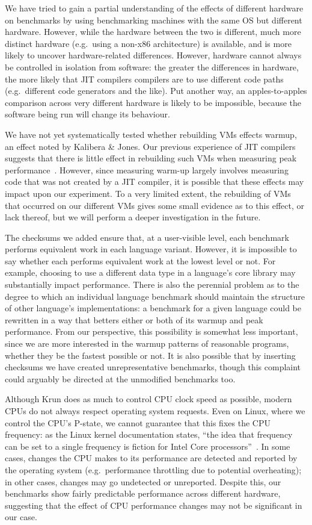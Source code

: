 \documentclass[preprint,numbers,10pt]{sigplanconf}
\newcommand{\kalibera}{Kalibera \& Jones\xspace}
\newcommand{\krun}{Krun\xspace}
\begin{document}
We have tried to gain a partial understanding of the effects of different
hardware on benchmarks by using benchmarking machines with the same OS but
different hardware. However, while the hardware between the two is
different, much more distinct hardware (e.g.~using a non-x86 architecture) is
available, and is more likely to uncover hardware-related differences.
However, hardware cannot always be controlled in isolation from software:
the greater the differences in hardware, the more likely that JIT compilers
compilers are to use different code paths (e.g.~different code generators and
the like). Put another way, an apples-to-apples comparison across very different
hardware is likely to be impossible, because the software being run will
change its behaviour.

We have not yet systematically tested whether rebuilding VMs effects warmup, an
effect noted by \kalibera. Our previous experience of JIT compilers suggests
that there is little effect in rebuilding such VMs when measuring peak
performance~\cite{barrett15approaches}. However, since measuring warm-up largely
involves measuring code that was not created by a JIT compiler, it is possible
that these effects may impact upon our experiment. To a very limited extent, the
rebuilding of VMs that occurred on our different VMs gives some small evidence
as to this effect, or lack thereof, but we will perform a deeper investigation
in the future.

The checksums we added ensure that, at a user-visible level, each benchmark
performs equivalent work in each language variant. However, it is impossible to
say whether each performs equivalent work at the lowest level or not. For
example, choosing to use a different data type in a language's core library may
substantially impact performance. There is also the perennial problem as to the
degree to which an individual language benchmark should maintain the structure
of other language's implementations: a benchmark for a given language could be
rewritten in a way that betters either or both of its warmup and peak
performance. From our perspective, this possibility is somewhat less important,
since we are more interested in the warmup patterns of reasonable programs,
whether they be the fastest possible or not. It is also possible that by
inserting checksums we have created unrepresentative benchmarks, though
this complaint could arguably be directed at the unmodified benchmarks too.

Although \krun does as much to control CPU clock speed as possible, modern CPUs
do not always respect operating system requests. Even on Linux, where we control
the CPU's P-state, we cannot guarantee that this fixes the CPU frequency: as
the Linux kernel documentation states, ``the idea that frequency can be set to a single
frequency is fiction for Intel Core processors''~\cite{pstate}. In
some cases, changes the CPU makes to its performance are detected and reported
by the operating system (e.g.~performance throttling due to potential
overheating); in other cases, changes may go undetected or unreported.
Despite this, our benchmarks show fairly predictable performance across
different hardware, suggesting that the effect of CPU performance changes may
not be significant in our case.
\end{document}
